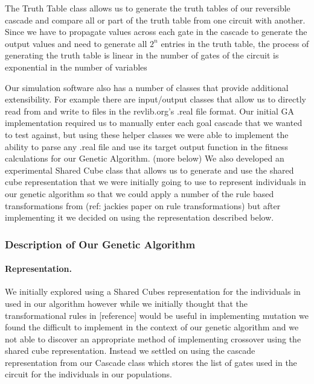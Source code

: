 The Truth Table class allows us to generate the truth tables of our reversible cascade and compare all or part of the truth 
table from one circuit with another. Since we have to propagate values across each gate in the cascade to generate the output 
values and need to generate all \(2^{n}\) entries in the truth table, the process of generating the truth table is linear in the 
number of gates of the circuit is exponential in the number of variables 

Our simulation software also has a number of classes that provide additional extensibility. For example there are input/output 
classes that allow us to directly read from and write to files in the revlib.org's .real file format. Our initial GA implementation 
required us to manually enter each goal cascade that we wanted to test against, but using these helper classes we were able to 
implement the ability to parse any .real file and use its target output function in the fitness calculations for our Genetic 
Algorithm. (more below) We also developed an experimental Shared Cube class that allows us to generate and use the shared cube 
representation that we were initially going to use to represent individuals in our genetic algorithm so that we could apply a 
number of the rule based transformations from (ref: jackies paper on rule transformations) but after implementing it we decided 
on using the representation described below. 

  \subsubsection{Description of Our Genetic Algorithm}

\paragraph{Representation.} 

We initially explored using a Shared Cubes representation for the individuals in used in our algorithm however while we initially 
thought that the transformational rules  in [reference] would be useful in implementing mutation we found the difficult to implement 
in the context of our genetic algorithm and we not able to discover an appropriate method of implementing crossover using the shared 
cube representation. Instead we settled on using the cascade representation from our Cascade class which stores the list of gates used 
in the circuit for the individuals in our populations.

